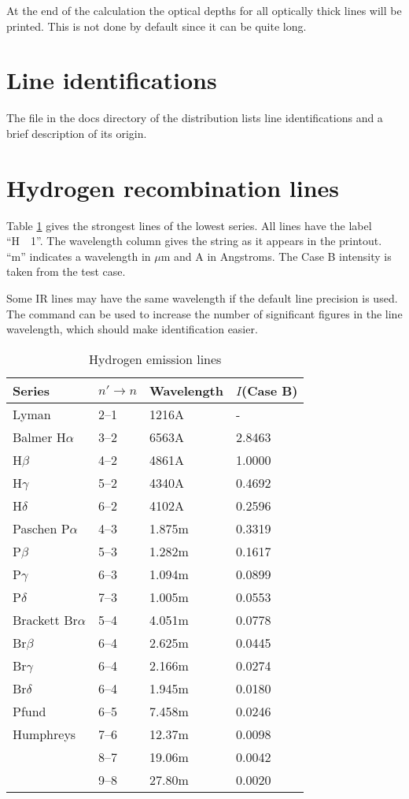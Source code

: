   At the end of the calculation the optical
depths for all optically thick lines will be printed.
This is not done
by default since it can be quite long.

\section{Line identifications}

The file  in the docs directory of the distribution lists
line identifications and a brief description of its origin.

\section{Hydrogen recombination lines}

Table \ref{tab:HydrogenEmissionLines} gives the strongest lines
of the lowest series.
All lines have the label ``H~~1''.
The wavelength column gives
the string as it appears in the printout.  ``m'' indicates a wavelength
in $\mu$m and A in Angstroms.
The Case B intensity is taken from the
 test case.

Some IR lines may have the same wavelength if the default line precision is used.
The  command can be used 
to increase the number of significant figures in the
line wavelength, which should make identification easier.

\begin{table}
\centering
\caption{\label{tab:HydrogenEmissionLines}Hydrogen emission lines}
\begin{tabular}{llll}
\hline
Series& $n'\to n$& Wavelength& $I$(Case B)\\
\hline
Lyman& 2--1& 1216A& - \\
Balmer H$\alpha$& 3--2& 6563A     &2.8463\\
H$\beta$& 4--2& 4861A     &1.0000\\
H$\gamma$& 5--2& 4340A     &0.4692\\
H$\delta$& 6--2& 4102A     &0.2596\\
Paschen P$\alpha$& 4--3& 1.875m   & 0.3319\\
P$\beta$& 5--3& 1.282m    &0.1617\\
P$\gamma$& 6--3& 1.094m    &0.0899\\
P$\delta$& 7--3& 1.005m    &0.0553\\
Brackett Br$\alpha$& 5--4& 4.051m &    0.0778\\
Br$\beta$& 6--4& 2.625m&     0.0445\\
Br$\gamma$& 6--4& 2.166m&     0.0274\\
Br$\delta$& 6--4& 1.945m&     0.0180\\
Pfund& 6--5& 7.458m& 0.0246\\
Humphreys& 7--6& 12.37m& 0.0098\\
& 8--7& 19.06m& 0.0042\\
& 9--8& 27.80m& 0.0020\\
\hline
\end{tabular}
\end{table}

